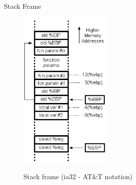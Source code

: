 \begin{frame}{Stack Frame}
	\begin{figure}
        \includegraphics[width=0.4\textwidth]{imgs/stackframe.png}
        \label{fig:stackframe}
        \caption{Stack frame (ia32 - AT\&T notation)}
    \end{figure}	

\end{frame}
